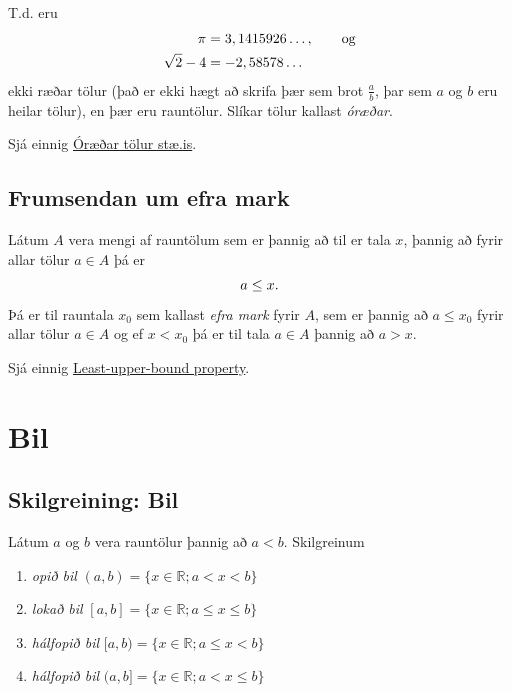 \documentclass[b5paper,10pt,icelandic]{sphinxmanual}
\begin{document}
T.d. eru
\begin{gather}
\begin{split}\begin{aligned}
\pi &= 3,1415926\ldots, \qquad \text{og}\\
\sqrt 2 -4  &= -2,58578\ldots\end{aligned}\end{split}\notag
\end{gather}
ekki ræðar tölur (það er ekki hægt að skrifa þær sem brot
\(\frac ab\), þar sem \(a\) og \(b\) eru heilar tölur), en
þær eru rauntölur. Slíkar tölur kallast \textit{óræðar}.

Sjá einnig \href{http://www.xn--st-2ia.is/fletta/\%C3\%B3r\%C3\%A6\%C3\%B0ar\_t\%C3\%B6lur}{Óræðar tölur \textbar{} stæ.is}.


\subsection{Frumsendan um efra mark}
\label{kafli01:index-1}\label{kafli01:frumsendanumeframark}\label{kafli01:frumsendan-um-efra-mark}
Látum \(A\) vera mengi af rauntölum sem
er þannig að til er tala \(x\), þannig að fyrir allar tölur
\(a \in A\) þá er
\begin{gather}
\begin{split}a\leq x.\end{split}\notag
\end{gather}
Þá er til rauntala \(x_0\) sem kallast \textit{efra mark} fyrir
\(A\), sem er þannig að \(a\leq x_0\) fyrir allar tölur
\(a\in
A\) og ef \(x<x_0\) þá er til tala \(a\in A\) þannig að
\(a>x\).

Sjá einnig \href{https://en.wikipedia.org/wiki/Least-upper-bound\_property}{Least-upper-bound property}.


\section{Bil}
\label{kafli01:bil}\label{kafli01:skilgreining-1-3-1}

\subsection{Skilgreining: Bil}
\label{kafli01:index-2}\label{kafli01:skilgreining-bil}
Látum \(a\) og \(b\) vera rauntölur þannig að
\(a<b\). Skilgreinum
\begin{enumerate}
\item {} 
\emph{opið bil} \((a,b)=\{x\in \mathbb{R}; a<x<b\}\)

\item {} 
\emph{lokað bil} \([a,b]=\{x\in \mathbb{R}; a\leq x\leq b\}\)

\item {} 
\emph{hálfopið bil} \([a,b)=\{x\in \mathbb{R}; a\leq x<b\}\)

\item {} 
\emph{hálfopið bil} \((a,b]=\{x\in \mathbb{R}; a< x\leq b\}\)

\end{enumerate}
\end{document}
